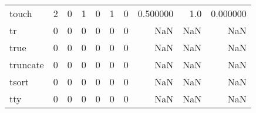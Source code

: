 \begin{tabular}{lrrrrrrrrr}
touch     &                                       2 &                                                  0 &                                                  1 &                                                  0 &                                                  1 &                                                  0 &                                           0.500000 &                                    1.0 &                             0.000000 \\
tr        &                                       0 &                                                  0 &                                                  0 &                                                  0 &                                                  0 &                                                  0 &                                                NaN &                                    NaN &                                  NaN \\
true      &                                       0 &                                                  0 &                                                  0 &                                                  0 &                                                  0 &                                                  0 &                                                NaN &                                    NaN &                                  NaN \\
truncate  &                                       0 &                                                  0 &                                                  0 &                                                  0 &                                                  0 &                                                  0 &                                                NaN &                                    NaN &                                  NaN \\
tsort     &                                       0 &                                                  0 &                                                  0 &                                                  0 &                                                  0 &                                                  0 &                                                NaN &                                    NaN &                                  NaN \\
tty       &                                       0 &                                                  0 &                                                  0 &                                                  0 &                                                  0 &                                                  0 &                                                NaN &                                    NaN &                                  NaN \\

\end{tabular}
